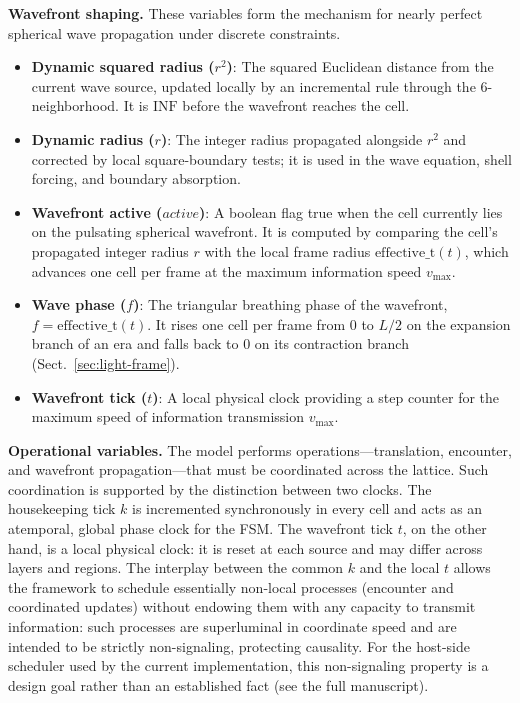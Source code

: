 \documentclass[a4paper]{article}
\begin{document}
\medskip\noindent\textbf{Wavefront shaping.}
These variables form the mechanism for nearly perfect spherical wave propagation under discrete constraints.
\begin{itemize}
\item \textbf{Dynamic squared radius ($r^2$)}: The squared Euclidean distance from the current wave source, updated locally by an incremental rule through the 6-neighborhood. It is $\mathrm{INF}$ before the wavefront reaches the cell.
\item \textbf{Dynamic radius ($r$)}: The integer radius propagated alongside $r^2$ and corrected by local square-boundary tests; it is used in the wave equation, shell forcing, and boundary absorption.
\item \textbf{Wavefront active ($\mathit{active}$)}: A boolean flag true when the cell currently lies on the pulsating spherical wavefront. It is computed by comparing the cell's propagated integer radius $r$ with the local frame radius $\mathrm{effective\_t}(t)$, which advances one cell per frame at the maximum information speed $v_{\max}$.
\item \textbf{Wave phase ($f$)}: The triangular breathing phase of the wavefront, $f = \mathrm{effective\_t}(t)$. It rises one cell per frame from $0$ to $L/2$ on the expansion branch of an era and falls back to $0$ on its contraction branch (Sect.~\ref{sec:light-frame}).
\item \textbf{Wavefront tick ($t$)}: A local physical clock providing a step counter for the maximum speed of information transmission $v_{\max}$.
\end{itemize}

\medskip\noindent\textbf{Operational variables.}
The model performs operations---translation, encounter, and wavefront propagation---that must be coordinated across the lattice. Such coordination is supported by the distinction between two clocks. The housekeeping tick $k$ is incremented synchronously in every cell and acts as an atemporal, global phase clock for the FSM. The wavefront tick $t$, on the other hand, is a local physical clock: it is reset at each source and may differ across layers and regions. The interplay between the common $k$ and the local $t$ allows the framework to schedule essentially non-local processes (encounter and coordinated updates) without endowing them with any capacity to transmit information: such processes are superluminal in coordinate speed and are intended to be strictly non-signaling, protecting causality.  For the host-side scheduler used by the current implementation, this non-signaling property is a design goal rather than an established fact (see the full manuscript).
\end{document}
